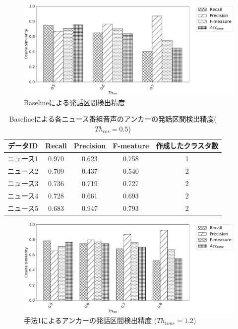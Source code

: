 {\begin{figure}[H]
  \begin{center}
    \includegraphics[scale=0.5]{./figure/baseline.eps}
  \end{center}
  \caption{Baselineによる発話区間検出精度 \label{fig:result_anchor_baseline}}
\end{figure}

\begin{table}[H]
  \begin{center}
    \caption{Baselineによる各ニュース番組音声のアンカーの発話区間検出精度($Th_{cos}=0.5$) \label{table:baseline_eachnews}}
    \begin{tabular}{|c||c|c|c|c|} \hline
データID & Recall & Precision & F-meature & 作成したクラスタ数\\ \hline
ニュース1 & 0.970 & 0.623 & 0.758 & 1 \\ \hline
ニュース2 & 0.709 & 0.437 & 0.540 & 2 \\ \hline
ニュース3 & 0.736 & 0.719 & 0.727 & 2 \\ \hline
ニュース4 & 0.728 & 0.661 & 0.693 & 2 \\ \hline
ニュース5 & 0.683 & 0.947 & 0.793 & 2 \\ \hline
    \end{tabular}
  \end{center}
\end{table}

\begin{figure}[H]
  \begin{center}
    \includegraphics[scale=0.5]{./figure/prob1_12.eps}
  \end{center}
  \caption{手法1によるアンカーの発話区間検出精度 ($Th_{time}=1.2$) \label{fig:result_anchor_prob1}}
\end{figure}

}
